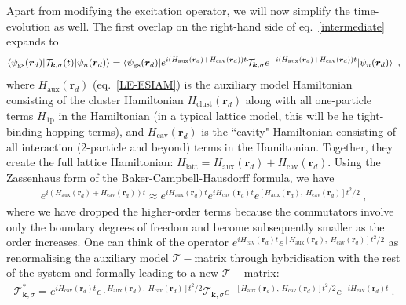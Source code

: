 Apart from modifying the excitation operator, we will now simplify the time-evolution as well. The first overlap on the right-hand side of eq.~\ref{intermediate} expands to
\begin{equation}\begin{aligned}
	\braket{\psi_\text{gs}({\bm r_d}) | \mathcal{T}_{{\bm k},\sigma}(t) | \psi_{n}({\bm r_d})} = \braket{\psi_\text{gs}({\bm r_d}) | e^{i(H_\text{aux}(\bm r_d) + H_\text{cav}(\bm r_d))t} \mathcal{T}_{{\bm k},\sigma} e^{-i(H_\text{aux}(\bm r_d) + H_\text{cav}(\bm r_d))t} | \psi_{n}({\bm r_d})}~,
\end{aligned}\end{equation}
where \(H_\text{aux}(\bm r_d)\) (eq.~\ref{LE-ESIAM}) is the auxiliary model Hamiltonian consisting of the cluster Hamiltonian \(H_\text{clust}(\bm r_d)\) along with all one-particle terms \(H_\text{1p}\) in the Hamiltonian (in a typical lattice model, this will be he tight-binding hopping terms), and \(H_\text{cav}(\bm r_d)\) is the ``cavity" Hamiltonian consisting of all interaction (2-particle and beyond) terms in the Hamiltonian. Together, they create the full lattice Hamiltonian: \(H_\text{latt} = H_\text{aux}(\bm r_d) + H_\text{cav}(\bm r_d)\). Using the Zassenhaus form of the Baker-Campbell-Hausdorff formula, we have
\begin{equation}\begin{aligned}
	e^{i(H_\text{aux}(\bm r_d) + H_\text{cav}(\bm r_d))t} \approx e^{iH_\text{aux}(\bm r_d)t} e^{i H_\text{cav}(\bm r_d)t}e^{[H_\text{aux}(\bm r_d),~H_\text{cav}(\bm r_d)]t^2/2}~,
\end{aligned}\end{equation}
where we have dropped the higher-order terms because the commutators involve only the boundary degrees of freedom and become subsequently smaller as the order increases. One can think of the operator \(e^{i H_\text{cav}(\bm r_d)t}e^{[H_\text{aux}(\bm r_d),~H_\text{cav}(\bm r_d)]t^2/2}\) as renormalising the auxiliary model \(\mathcal{T}-\)matrix through hybridisation with the rest of the system and formally leading to a new \(\mathcal{T}-\)matrix:
\begin{equation}\begin{aligned}
	\mathcal{T}_{{\bm k},\sigma}^* = e^{i H_\text{cav}(\bm r_d)t}e^{[H_\text{aux}(\bm r_d),~H_\text{cav}(\bm r_d)]t^2/2}\mathcal{T}_{{\bm k},\sigma}e^{-[H_\text{aux}(\bm r_d),~H_\text{cav}(\bm r_d)]t^2/2}e^{-i H_\text{cav}(\bm r_d)t}~.
\end{aligned}\end{equation}
